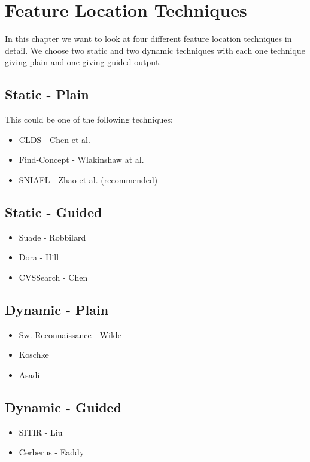 \chapter{Feature Location Techniques}

In this chapter we want to look at four different feature location techniques in detail. We choose two static and two dynamic techniques with each one technique giving plain and one giving guided output.

\section{Static - Plain}
This could be one of the following techniques:
\begin{itemize}
\item CLDS - Chen et al.
\item Find-Concept - Wlakinshaw at al.
\item SNIAFL - Zhao et al. (recommended)
\end{itemize}

\section{Static - Guided}
\begin{itemize}
\item Suade - Robbilard
\item Dora - Hill
\item  CVSSearch - Chen
\end{itemize}

\section{Dynamic - Plain}
\begin{itemize}
\item Sw. Reconnaissance - Wilde
\item Koschke
\item Asadi
\end{itemize}

\section{Dynamic - Guided}
\begin{itemize}
\item SITIR - Liu
\item Cerberus - Eaddy
\end{itemize}


